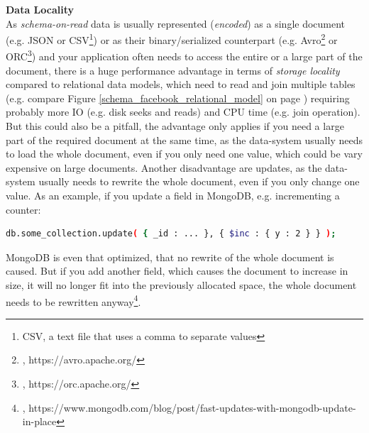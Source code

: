 {\textbf{Data Locality}\\
As \textit{schema-on-read} data is usually represented (\textit{encoded}) as a single document (e.g. JSON or CSV\footnote{CSV, a text file that uses a comma to separate values}) or as their binary/serialized counterpart (e.g. Avro\footnote{\cite{AVRO}, https://avro.apache.org/} or ORC\footnote{\cite{ORC}, https://orc.apache.org/}) and your application often needs to access the entire or a large part of the document, there is a huge performance advantage in terms of \textit{storage locality} compared to relational data models, which need to read and join multiple tables (e.g. compare Figure \ref{schema_facebook_relational_model} on page \pageref{schema_facebook_relational_model}) requiring probably more IO (e.g. disk seeks and reads) and CPU time (e.g. join operation).
But this could also be a pitfall, the advantage only applies if you need a large part of the required document at the same time, as the data-system usually needs to load the whole document, even if you only need one value, which could be vary expensive on large documents. 
Another disadvantage are updates, as the data-system usually needs to rewrite the whole document, even if you only change one value. As an example, if you update a field in MongoDB, e.g. incrementing a counter:
\begin{lstlisting}[language=bash,frame=none,numbers=none,xleftmargin=0.05\textwidth,xrightmargin=0.05\textwidth]
 db.some_collection.update( { _id : ... }, { $inc : { y : 2 } } );
\end{lstlisting}
MongoDB is even that optimized, that no rewrite of the whole document is caused. But if you add another field, which causes the document to increase in size, it will no longer fit into the previously allocated space, the whole document needs to be rewritten anyway\footnote{\cite{MDBIP}, https://www.mongodb.com/blog/post/fast-updates-with-mongodb-update-in-place}.\\

}
